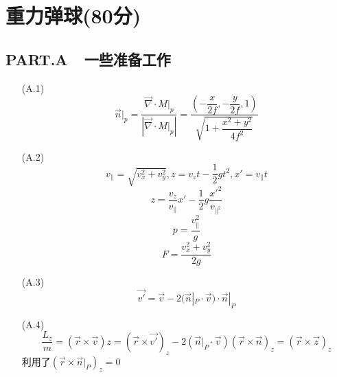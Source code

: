 \documentclass{article}
\begin{document}
\section*{重力弹球(80分)}

\subsection*{PART.A\ \ 一些准备工作}
\begin{itemize}
    \item[(A.1)]
    \begin{equation}\vec{n}|_p=\dfrac{\vec{\nabla}\cdot M|_p}{\left|\vec{\nabla}\cdot M|_p\right|}=\dfrac{(-\dfrac{x}{2f},-\dfrac{y}{2f},1)}{\sqrt{1+\dfrac{x^2+y^2}{4f^2}}}\end{equation}
    \item[(A.2)]
    \begin{equation}v_{\parallel}=\sqrt{v_{x}^{2}+v_{y}^{2}},z=v_z t-\frac{1}{2}gt^{2},x'=v_{\parallel}t\end{equation}
    \begin{equation}z=\frac{v_z}{v_{\parallel}}x'-\dfrac{1}{2}g\dfrac{x'^{2}}{v_{\parallel^2}}\end{equation}
    \begin{equation}p=\frac{v_{\parallel}^{2}}{g}\end{equation}
    \begin{equation}F=\frac{v_x^2+v_y^2}{2g}\end{equation}
    \item[(A.3)]
    \begin{equation}\vec{v'}=\vec{v}-2(\vec{n}|_P\cdot\vec{v})\cdot\vec{n}|_P\end{equation}
    \item[(A.4)]
    \begin{equation}\dfrac{L_z}{m}=(\vec{r}\times\vec{v})z=(\vec{r}\times\vec{v'})_z-2(\vec{n}|_P\cdot\vec{v})(\vec{r}\times\vec{n})_z=(\vec{r}\times\vec{z})_z\end{equation}
    利用了$(\vec{r}\times\vec{n}|_P)_z=0$
\end{itemize}
\end{document}

